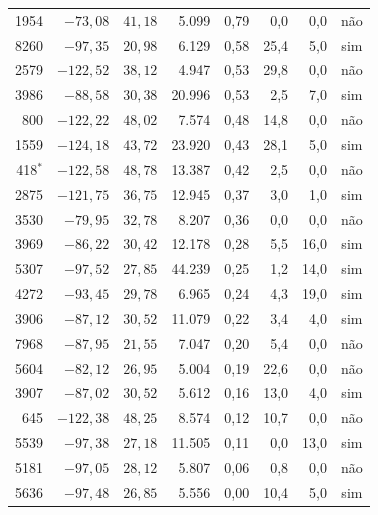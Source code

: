 {\begin{longtable}{rrrrrrrc}
		1954 & $-73{,}08$ & $41{,}18$ & 5.099 & 0,79 & 0,0 & 0,0 & não \\
		8260 & $-97{,}35$ & $20{,}98$ & 6.129 & 0,58 & 25,4 & 5,0 & sim \\
		2579 & $-122{,}52$ & $38{,}12$ & 4.947 & 0,53 & 29,8 & 0,0 & não \\
		3986 & $-88{,}58$ & $30{,}38$ & 20.996 & 0,53 & 2,5 & 7,0 & sim \\
		800 & $-122{,}22$ & $48{,}02$ & 7.574 & 0,48 & 14,8 & 0,0 & não \\
		1559 & $-124{,}18$ & $43{,}72$ & 23.920 & 0,43 & 28,1 & 5,0 & sim \\
		418$^{*}$ & $-122{,}58$ & $48{,}78$ & 13.387 & 0,42 & 2,5 & 0,0 & não \\
		2875 & $-121{,}75$ & $36{,}75$ & 12.945 & 0,37 & 3,0 & 1,0 & sim \\
		3530 & $-79{,}95$ & $32{,}78$ & 8.207 & 0,36 & 0,0 & 0,0 & não \\
		3969 & $-86{,}22$ & $30{,}42$ & 12.178 & 0,28 & 5,5 & 16,0 & sim \\
		5307 & $-97{,}52$ & $27{,}85$ & 44.239 & 0,25 & 1,2 & 14,0 & sim \\
		4272 & $-93{,}45$ & $29{,}78$ & 6.965 & 0,24 & 4,3 & 19,0 & sim \\
		3906 & $-87{,}12$ & $30{,}52$ & 11.079 & 0,22 & 3,4 & 4,0 & sim \\
		7968 & $-87{,}95$ & $21{,}55$ & 7.047 & 0,20 & 5,4 & 0,0 & não \\
		5604 & $-82{,}12$ & $26{,}95$ & 5.004 & 0,19 & 22,6 & 0,0 & não \\
		3907 & $-87{,}02$ & $30{,}52$ & 5.612 & 0,16 & 13,0 & 4,0 & sim \\
		645 & $-122{,}38$ & $48{,}25$ & 8.574 & 0,12 & 10,7 & 0,0 & não \\
		5539 & $-97{,}38$ & $27{,}18$ & 11.505 & 0,11 & 0,0 & 13,0 & sim \\
		5181 & $-97{,}05$ & $28{,}12$ & 5.807 & 0,06 & 0,8 & 0,0 & não \\
		5636 & $-97{,}48$ & $26{,}85$ & 5.556 & 0,00 & 10,4 & 5,0 & sim \\
\end{longtable}
}
